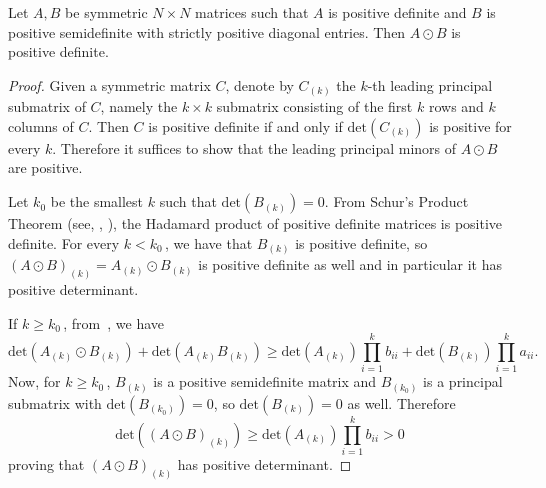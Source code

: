 \documentclass{toc}
\newcommand{\textprod}{{\textstyle \prod}}
\renewcommand{\det}{\mathrm{det}}
\begin{document}
\begin{lemma}\label{lemma: posdef odot positive psd is pos def}
Let $A,B$ be symmetric $N \times N$ matrices such that $A$ is positive definite and $B$ is positive semidefinite with strictly positive diagonal entries. 
Then $A \odot B$ is positive definite.
\end{lemma}
\begin{proof}
Given a symmetric matrix $C$, denote by $C_{(k)}$ the $k$-th leading principal submatrix of $C$, namely the $k\times k$ submatrix consisting of the first $k$ rows and $k$ columns of $C$. Then $C$ is positive definite if and only if $\det(C_{(k)})$ is positive for every $k$. Therefore it suffices to show that the leading principal minors of $A \odot B$ are positive.

Let $k_0$ be the smallest $k$ such that $\det(B_{(k)}) = 0$. {}From Schur's Product Theorem (see, \eg, \cite[Ex.~36.2.1]{MR1277174}), the Hadamard product of positive definite matrices is positive definite. For every $k < k_0$\,, we have that $B_{(k)}$ is positive definite, so $(A\odot B)_{(k)} = A_{(k)} \odot B_{(k)}$ is positive definite as well and in particular it has positive determinant.

If $k \geq k_0$\,, from~\cite[Eqn.~1.11]{Lynn:schurProductInequalities}, we have 
 \[
  \det(A_{(k)} \odot B_{(k)}) + \det(A_{(k)}B_{(k)}) \geq \det(A_{(k)}) \textprod_{i=1}^{k} b_{ii} + \det(B_{(k)}) \textprod_{i=1}^{k} a_{ii}.
 \]
Now, for $k \geq k_0$\,, $B_{(k)}$ is a positive semidefinite matrix and $B_{(k_0)}$ is a principal submatrix with $\det( B_{(k_0)})= 0$, so $\det( B_{(k)}) = 0$ as well. Therefore
 \[
 \det((A \odot B)_{(k)} ) \geq \det(A_{(k)}) \textprod_{i=1}^k b_{ii} > 0
\]
proving that $(A \odot B)_{(k)} $ has positive determinant.  
\end{proof}
\end{document}
